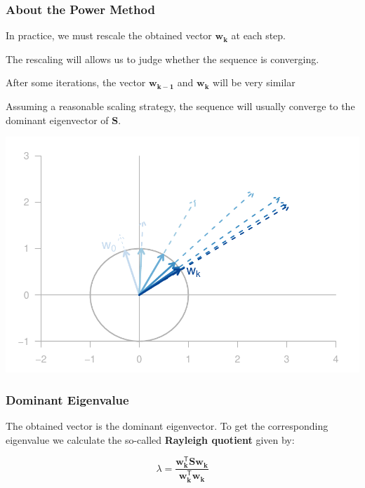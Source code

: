 \documentclass[12pt]{beamer}\usepackage[]{graphicx}\usepackage[]{color}
\makeatletter
\def\maxwidth{ %
  \ifdim\Gin@nat@width>\linewidth
    \linewidth
  \else
    \Gin@nat@width
  \fi
}
\newenvironment{knitrout}{}{} %
\makeatother
\begin{document}
\begin{frame}
\frametitle{About the Power Method}

\bbi
  \item In practice, we must rescale the obtained vector $\mathbf{w_k}$ at each step.
  \item The rescaling will allows us to judge whether the sequence is converging.
  \item After some iterations, the vector $\mathbf{w_{k-1}}$ and $\mathbf{w_k}$ will be very similar
  \item Assuming a reasonable scaling strategy, the sequence will usually converge 
  to the dominant eigenvector of $\mathbf{S}$.
\ei

\end{frame}


\begin{frame}[fragile]

\begin{knitrout}\footnotesize
{}\color{fgcolor}

{\centering \includegraphics[width=\maxwidth]{figure/power-method-rescale-1} 

}



\end{knitrout}

\end{frame}


\begin{frame}
\frametitle{Dominant Eigenvalue}

The obtained vector is the dominant eigenvector. To get the 
corresponding eigenvalue we calculate the so-called \textbf{Rayleigh quotient}
given by:

{\Large
$$
\lambda = \frac{\mathbf{w_{k}^{\mathsf{T}} S w_k}}{\mathbf{w_{k}^{\mathsf{T}} w_k}}
$$
}

\end{frame}
\end{document}

